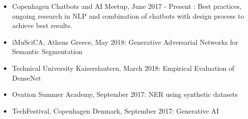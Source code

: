 \documentclass[10pt,letterpaper]{article}
\begin{document}
\begin{itemize}
	\parskip=0.1em
	
	\item Copenhagen Chatbots and AI Meetup, June 2017 - Present : Best practices, ongoing research in NLP and combination of chatbots with design process to achieve best results.
	
	\item iMuSciCA, Athens Greece, May 2018: Generative Adversarial Networks for Semantic Segmentation 
	
	\item Technical University Kaiserslautern, March 2018: Empirical Evaluation of DenseNet 
		
	\item Ovation Summer Academy, September 2017: NER using synthetic datasets 
	
	\item TechFestival, Copenhagen Denmark, September 2017: Generative AI 
	
	
\end{itemize}
\end{document}
